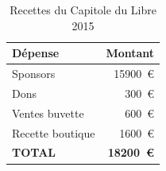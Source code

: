 \begin{table}
\begin{center}
    \caption{Recettes du Capitole du Libre 2015}\label{tab_recettes}
    \begin{tabular}{|l|r|}
        \hline \textbf{Dépense} & \textbf{Montant} \\
        \hline Sponsors & \SI{15900}{€} \\
        \hline Dons & \SI{300}{€} \\
        \hline Ventes buvette & \SI{600}{€} \\
        \hline Recette boutique & \SI{1600}{€} \\
        \hline
        \hline \textbf{TOTAL} & \textbf{\SI{18200}{€}} \\
        \hline
    \end{tabular}
\end{center}
\end{table}

